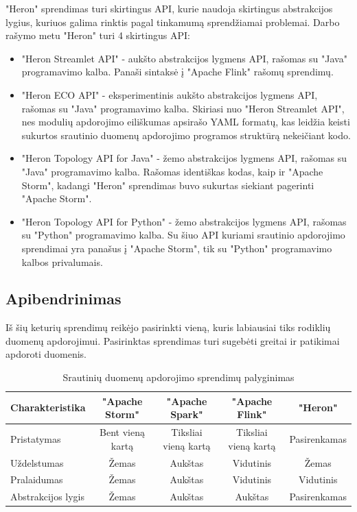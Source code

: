 \documentclass{VUMIFPSbakalaurinis}
\begin{document}
"Heron" sprendimas turi skirtingus API, kurie naudoja skirtingus abstrakcijos lygius, kuriuos galima rinktis pagal tinkamumą sprendžiamai problemai. Darbo rašymo metu "Heron" turi 4 skirtingus API:
\begin{itemize}
    \item "Heron Streamlet API" - aukšto abstrakcijos lygmens API, rašomas su "Java" programavimo kalba. Panaši sintaksė į "Apache Flink" rašomų sprendimų.
    \item "Heron ECO API" - eksperimentinis aukšto abstrakcijos lygmens API, rašomas su "Java" programavimo kalba. Skiriasi nuo "Heron Streamlet API", nes modulių apdorojimo eiliškumas apsirašo YAML formatų, kas leidžia keisti sukurtos srautinio duomenų apdorojimo programos struktūrą nekeičiant kodo.
    \item "Heron Topology API for Java" - žemo abstrakcijos lygmens API, rašomas su "Java" programavimo kalba. Rašomas identiškas kodas, kaip ir "Apache Storm", kadangi "Heron" sprendimas buvo sukurtas siekiant pagerinti "Apache Storm".
    \item "Heron Topology API for Python" - žemo abstrakcijos lygmens API, rašomas su "Python" programavimo kalba. Su šiuo API kuriami srautinio apdorojimo sprendimai yra panašus į "Apache Storm", tik su "Python" programavimo kalbos privalumais.
\end{itemize}  


\subsection{Apibendrinimas}
Iš šių keturių sprendimų reikėjo pasirinkti vieną, kuris labiausiai tiks rodiklių duomenų apdorojimui. Pasirinktas sprendimas turi sugebėti greitai ir patikimai apdoroti duomenis.\par

\begin{table}[!htbp]
    \begin{center}
        \caption{Srautinių duomenų apdorojimo sprendimų palyginimas}
        \label{table:comparer}
        \begin{tabular}{ | l | c | c | c | c | }
            \hline
            \cellcolor[gray]{0.8} Charakteristika & \cellcolor[gray]{0.9} "Apache Storm" & \cellcolor[gray]{0.9} "Apache Spark" & \cellcolor[gray]{0.9} "Apache Flink" & \cellcolor[gray]{0.9} "Heron" \\* \hline
            \cellcolor[gray]{0.9} Pristatymas & Bent vieną kartą & Tiksliai vieną kartą & Tiksliai vieną kartą & Pasirenkamas \\* \hline
            \cellcolor[gray]{0.9} Uždelstumas & Žemas & Aukštas & Vidutinis & Žemas \\* \hline
            \cellcolor[gray]{0.9} Pralaidumas & Žemas & Aukštas & Vidutinis & Vidutinis \\* \hline
            \cellcolor[gray]{0.9} Abstrakcijos lygis & Žemas & Aukštas & Aukštas & Pasirenkamas \\* \hline
        \end{tabular}
    \end{center}
\end{table}\par
\end{document}
